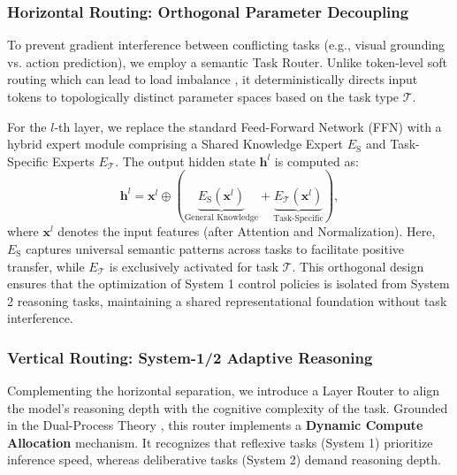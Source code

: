 \subsubsection{Horizontal Routing: Orthogonal Parameter Decoupling}
To prevent gradient interference between conflicting tasks (e.g., visual grounding vs. action prediction), we employ a semantic Task Router.  Unlike token-level soft routing which can lead to load imbalance \cite{shen2025mome}, it deterministically directs input tokens to topologically distinct parameter spaces based on the task type $\mathcal{T}$.

For the $l$-th layer, we replace the standard Feed-Forward Network (FFN) with a hybrid expert module comprising a Shared Knowledge Expert $E_\text{S}$ and Task-Specific Experts $E_\mathcal{T}$. The output hidden state $\mathbf{h}^l$ is computed as:
\begin{equation}
\label{eq:horizontal_routing}
\mathbf{h}^l = \mathbf{x}^l  \oplus (\underbrace{E_{\text{S}}(\mathbf{x}^l)}_{\text{General Knowledge}} + \underbrace{E_{\mathcal{T}}(\mathbf{x}^l)}_{\text{Task-Specific}}),
\end{equation}
where $\mathbf{x}^l$ denotes the input features (after Attention and Normalization). Here, $E_\text{S}$ captures universal semantic patterns across tasks to facilitate positive transfer, while $E_\mathcal{T}$ is exclusively activated for task $\mathcal{T}$. This orthogonal design ensures that the optimization of System 1 control policies is isolated from System 2 reasoning tasks, maintaining a shared representational foundation without task interference.

\subsubsection{Vertical Routing: System-1/2 Adaptive Reasoning}
Complementing the horizontal separation, we introduce a Layer Router to align the model's reasoning depth with the cognitive complexity of the task. Grounded in the Dual-Process Theory \cite{kahneman2011thinking}, this router implements a \textbf{Dynamic Compute Allocation} mechanism. It recognizes that reflexive tasks (System 1) prioritize inference speed, whereas deliberative tasks (System 2) demand reasoning depth.

